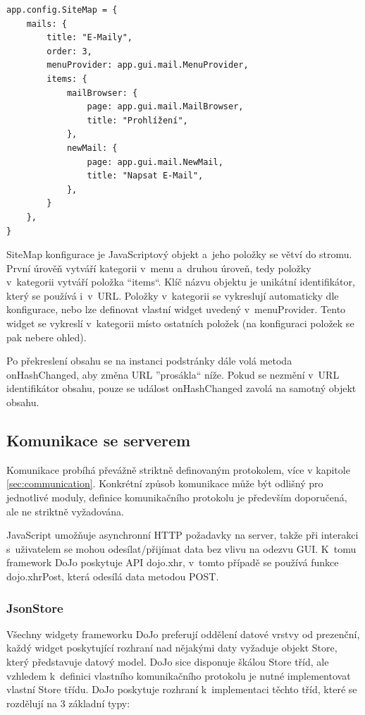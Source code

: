 \documentclass[bc,male,html,dept460]{diploma}				%
\begin{document}
\newpage
\begin{lstlisting}[label=src:JavaScript,caption=Struktura SiteMap,extendedchars=true]
app.config.SiteMap = {
	mails: {
		title: "E-Maily",
		order: 3,
		menuProvider: app.gui.mail.MenuProvider,
		items: {
			mailBrowser: {
				page: app.gui.mail.MailBrowser,
				title: "Prohlížení",
			},
			newMail: {
				page: app.gui.mail.NewMail,
				title: "Napsat E-Mail",
			},
		}
	},
}
\end{lstlisting}

SiteMap konfigurace je JavaScriptový objekt a~jeho položky se větví do stromu. První úrověň vytváří kategorii v~menu a~druhou úroveň, tedy položky v~kategorii vytváří položka ``items``. Klíč názvu objektu je unikátní identifikátor, který se používá i~v~URL.
Položky v~kategorii se vykreslují automaticky dle konfigurace, nebo lze definovat vlastní widget uvedený v~menuProvider. Tento widget se vykreslí v~kategorii místo ostatních položek (na konfiguraci položek se pak nebere ohled).

Po překreslení obsahu se na instanci podstránky dále volá metoda onHashChanged, aby změna URL ''prosákla`` níže. Pokud se nezmění v~URL identifikátor obsahu, pouze se událost onHashChanged zavolá na samotný objekt obsahu.



\subsection{Komunikace se serverem}
Komunikace probíhá převážně striktně definovaným protokolem, více v kapitole \ref{sec:communication}. Konkrétní způsob komunikace může být odlišný pro jednotlivé moduly, definice komunikačního protokolu je především doporučená, ale ne striktně vyžadována.

JavaScript umožňuje asynchronní  HTTP požadavky na server, takže při interakci s~uživatelem se mohou odesílat/přijímat data bez vlivu na odezvu GUI.
K~tomu framework DoJo poskytuje API dojo.xhr, v~tomto případě se používá funkce dojo.xhrPost, která odesílá data metodou POST.

\subsubsection{JsonStore}
Všechny widgety frameworku DoJo preferují oddělení datové vrstvy od prezenční, každý widget poskytující rozhraní nad nějakými daty vyžaduje objekt Store, který představuje datový model. DoJo sice disponuje škálou Store tříd, ale vzhledem k~definici vlastního komunikačního protokolu je nutné implementovat vlastní Store třídu. DoJo poskytuje rozhraní k~implementaci těchto tříd, které se rozdělují na 3 základní typy:
\end{document}
